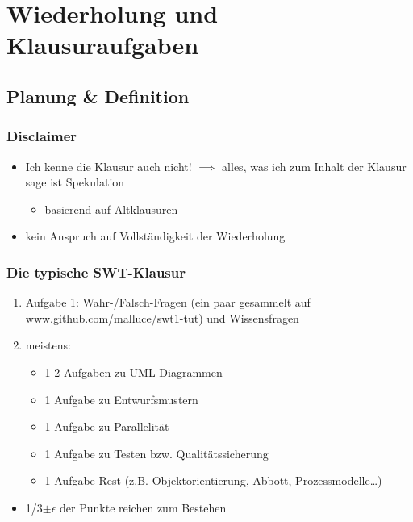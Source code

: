 \documentclass[18pt]{beamer}
\begin{document}
\section{Wiederholung und Klausuraufgaben}

	\subsection{Planung \& Definition}
	\begin{frame}
		\frametitle{Disclaimer}
		\begin{large}
			\begin{itemize}
				\item Ich kenne die Klausur auch nicht! \pause
				\linebreak $\implies$ alles, was ich zum Inhalt der Klausur sage ist Spekulation
				\begin{itemize}
					\item basierend auf Altklausuren \pause
				\end{itemize}
				\item kein Anspruch auf Vollständigkeit der Wiederholung
			\end{itemize}
		\end{large}
	\end{frame}

	\begin{frame}
		\frametitle{Die typische SWT-Klausur}
		\begin{enumerate}
			\item Aufgabe 1: Wahr-/Falsch-Fragen (ein paar gesammelt auf \url{www.github.com/malluce/swt1-tut})
			 und Wissensfragen\pause
			\item meistens:
			\begin{itemize}
				\item 1-2 Aufgaben zu UML-Diagrammen \pause
				\item 1 Aufgabe zu Entwurfsmustern \pause
				\item 1 Aufgabe zu Parallelität \pause
				\item 1 Aufgabe zu Testen bzw. Qualitätssicherung \pause
				\item 1 Aufgabe Rest (z.B. Objektorientierung, Abbott, Prozessmodelle\dots) \pause
			\end{itemize}
		\end{enumerate}
		\begin{itemize}
			\item 1/3$\pm \epsilon$ der Punkte reichen zum Bestehen
		\end{itemize}
	\end{frame}
\end{document}
